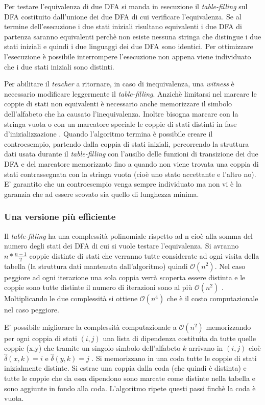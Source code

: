 Per testare l'equivalenza di due DFA si manda in esecuzione il \textit{table-filling} sul DFA costituito dall'unione dei due DFA di cui verificare l'equivalenza. Se al termine dell'esecuzione i due stati iniziali risultano equivalenti i due DFA di partenza saranno equivalenti perchè non esiste nessuna stringa che distingue i due stati iniziali e quindi i due linguaggi dei due DFA sono identici. Per ottimizzare l'esecuzione è possibile interrompere l'esecuzione non appena viene individuato che i due stati iniziali sono distinti.

Per abilitare il \textit{teacher} a ritornare, in caso di inequivalenza, una \textit{witness} è necessario modificare leggermente il \textit{table-filling}. Anzichè limitarsi nel marcare le coppie di stati non equivalenti è necessario anche memorizzare il simbolo dell'alfabeto che ha causato l'inequivalenza. Inoltre bisogna marcare con la stringa vuota o con un marcatore speciale le coppie di stati distinti in fase d'inizializzazione . Quando l'algoritmo termina è possibile creare il controesempio, partendo dalla coppia di stati iniziali, percorrendo la struttura dati usata durante il \textit{table-filling} con l'ausilio delle funzioni di transizione dei due DFA e del marcatore memorizzato fino a quando non viene trovata una coppia di stati contrassegnata con la stringa vuota (cioè uno stato accettante e l'altro no). E' garantito che un controesempio venga sempre individuato ma non vi è la garanzia che ad essere scovato sia quello di lunghezza minima.
\subsubsection{Una versione più efficiente}
Il \textit{table-filling} ha una complessità polinomiale rispetto ad n cioè alla somma del numero degli stati dei DFA di cui si vuole testare l'equivalenza. Si avranno $n*\frac{n-1}{2}$  coppie distinte di stati che verranno tutte considerate ad ogni visita della tabella (la struttura dati mantenuta dall'algoritmo) quindi $\mathcal{O}(n^{2})$. Nel caso peggiore ad ogni iterazione una sola coppia verrà scoperta essere distinta e le coppie sono tutte distinte il numero di iterazioni sono al più  $\mathcal{O}(n^{2})$ . Moltiplicando le due complessità si ottiene $\mathcal{O}(n^{4})$ che è il costo computazionale nel caso peggiore.

E' possibile migliorare la complessità computazionale a $\mathcal{O}(n^{2})$ memorizzando per ogni coppia di stati $(i,j)$ una lista di dipendenza costituita da tutte quelle coppie (x,y) che tramite un singolo simbolo dell'alfabeto $k$ arrivano in $(i,j)$ cioè $\hat{\delta}(x,k)=i$ e $\hat{\delta}(y,k)=j$ .
Si memorizzano in una coda tutte le coppie di stati inizialmente distinte. Si estrae una coppia dalla coda (che quindi è distinta) e tutte le coppie che da essa dipendono sono marcate come distinte nella tabella e sono aggiunte in fondo alla coda. L'algoritmo ripete questi passi finchè la coda è vuota.